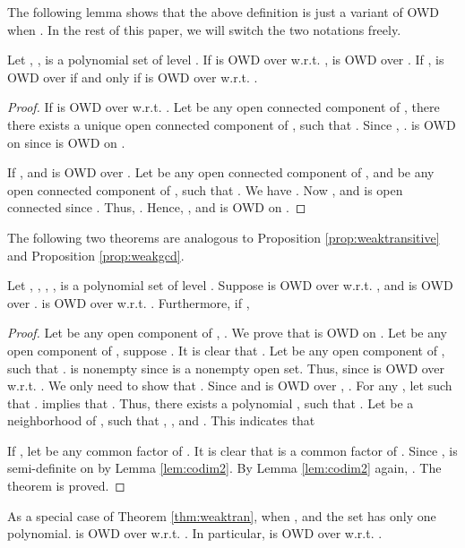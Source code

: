 \documentclass[amsthm]{elsart}
\begin{document}
The following lemma shows that the above definition is just a variant of OWD when . In the rest of this paper, we will switch the two notations freely. \begin{lem}\label{lem:owdeq}
  Let , ,  is a polynomial set of level . If  is OWD over  w.r.t. ,  is OWD over . If ,  is OWD over  if and only if  is OWD over  w.r.t. . \end{lem}
\begin{proof}
If  is OWD over  w.r.t. . Let  be any open connected component of , there there exists a unique open connected component  of , such that . Since , .   is OWD on  since  is OWD on .

If , and  is OWD over . Let  be any open connected component of , and  be any open connected component of , such that . We have . Now , and  is open connected since . Thus, . Hence, , and  is OWD on .
\end{proof}
\begin{comment}
      and 

   We only need to prove that there is a one to one correspondence between open connected component  of  and open connected component  of , and .

  Let  be any open connected component of , there exists a unique open connected component  of , such that . On one side, since , . On the other side, , and  since  is open connected by the definition of . Thus, .

  Let  be any open connected component of , there exists an open connected component  of , such that . Repeat the above argument again, we see that .
\end{comment}

The following two theorems are analogous to Proposition \ref{prop:weaktransitive} and Proposition \ref{prop:weakgcd}. \begin{thm}\label{thm:weaktran}
  Let , , , ,  is a polynomial set of level . Suppose  is OWD over  w.r.t. , and  is OWD over .  is OWD over  w.r.t. . Furthermore, if ,   \end{thm}
\begin{proof}
  Let  be any open component of , . We prove that  is OWD on . Let  be any open component of , suppose . It is clear that . Let  be any open component of , such that .  is nonempty since  is a nonempty open set. Thus,  since  is OWD over  w.r.t. . We only need to show that . Since  and  is OWD over , . For any , let  such that .  implies that . Thus, there exists a polynomial , such that . Let  be a neighborhood of , such that , , and
   . This indicates that 

 If , let  be any common factor of . It is clear that  is a common factor of . Since ,  is semi-definite on  by Lemma \ref{lem:codim2}. By Lemma \ref{lem:codim2} again, .
The theorem is proved.
\end{proof}
As a special case of Theorem \ref{thm:weaktran}, when , and the set  has only one polynomial.  is OWD over  w.r.t. . In particular,  is OWD over  w.r.t. .
\end{document}
